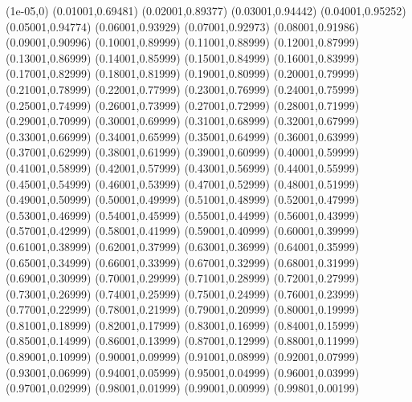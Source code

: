 \newcommand{\pontosEscala}{(102978790.97272025,0.0535502) (637809755.723865,0.888338) (1162674716.9430935,5.47735) (1939420032.5859938,7.1858) (2813296697.925454,31.1917)}
\newcommand{\retaEscala}{(51489395.486360125,0.0267751) (5626593395.850908,2.92589)}
\newcommand{\rotulosEscala}{\node[font=\scriptsize, anchor=north west, inner sep=2pt] at (axis cs:1.02979e+08,0.0535502) {\W{3}};
\node[font=\scriptsize, anchor=north west, inner sep=2pt] at (axis cs:6.3781e+08,0.888338) {\W{4}};
\node[font=\scriptsize, anchor=north west, inner sep=2pt] at (axis cs:1.16267e+09,5.47735) {\W{5}};
\node[font=\scriptsize, anchor=north west, inner sep=2pt] at (axis cs:1.93942e+09,7.1858) {\W{6}};
\node[font=\scriptsize, anchor=north west, inner sep=2pt] at (axis cs:2.8133e+09,31.1917) {\W{7}};}
\newcommand{\pontosVetorPos}{(100000,0.58068) (1000000,0.58948) (10000000,0.58744) (10000000,0.58398) (50000000,0.55454)}
\newcommand{\pontosAtualizacoes}{(121.99882,4.37223) (61.999956,3.71408) (7.999999,1.83981) (14.6806744,2.33595) (2.39999996,1.07483)}
\newcommand{\rotulosAtualizacoes}{\node[font=\scriptsize, anchor=north west, inner sep=2pt] at (axis cs:121.999,4.37223) {\W{3}};
\node[font=\scriptsize, anchor=north west, inner sep=2pt] at (axis cs:62,3.71408) {\W{4}};
\node[font=\scriptsize, anchor=north west, inner sep=2pt] at (axis cs:8,1.83981) {\W{5}};
\node[font=\scriptsize, anchor=north west, inner sep=2pt] at (axis cs:14.6807,2.33595) {\W{6}};
\node[font=\scriptsize, anchor=north west, inner sep=2pt] at (axis cs:2.4,1.07483) {\W{7}};}
\expandafter\def\csname heapTam@W_3\endcsname{(1e-05,0) (0.01001,0.69481) (0.02001,0.89377) (0.03001,0.94442) (0.04001,0.95252) (0.05001,0.94774) (0.06001,0.93929) (0.07001,0.92973) (0.08001,0.91986) (0.09001,0.90996) (0.10001,0.89999) (0.11001,0.88999) (0.12001,0.87999) (0.13001,0.86999) (0.14001,0.85999) (0.15001,0.84999) (0.16001,0.83999) (0.17001,0.82999) (0.18001,0.81999) (0.19001,0.80999) (0.20001,0.79999) (0.21001,0.78999) (0.22001,0.77999) (0.23001,0.76999) (0.24001,0.75999) (0.25001,0.74999) (0.26001,0.73999) (0.27001,0.72999) (0.28001,0.71999) (0.29001,0.70999) (0.30001,0.69999) (0.31001,0.68999) (0.32001,0.67999) (0.33001,0.66999) (0.34001,0.65999) (0.35001,0.64999) (0.36001,0.63999) (0.37001,0.62999) (0.38001,0.61999) (0.39001,0.60999) (0.40001,0.59999) (0.41001,0.58999) (0.42001,0.57999) (0.43001,0.56999) (0.44001,0.55999) (0.45001,0.54999) (0.46001,0.53999) (0.47001,0.52999) (0.48001,0.51999) (0.49001,0.50999) (0.50001,0.49999) (0.51001,0.48999) (0.52001,0.47999) (0.53001,0.46999) (0.54001,0.45999) (0.55001,0.44999) (0.56001,0.43999) (0.57001,0.42999) (0.58001,0.41999) (0.59001,0.40999) (0.60001,0.39999) (0.61001,0.38999) (0.62001,0.37999) (0.63001,0.36999) (0.64001,0.35999) (0.65001,0.34999) (0.66001,0.33999) (0.67001,0.32999) (0.68001,0.31999) (0.69001,0.30999) (0.70001,0.29999) (0.71001,0.28999) (0.72001,0.27999) (0.73001,0.26999) (0.74001,0.25999) (0.75001,0.24999) (0.76001,0.23999) (0.77001,0.22999) (0.78001,0.21999) (0.79001,0.20999) (0.80001,0.19999) (0.81001,0.18999) (0.82001,0.17999) (0.83001,0.16999) (0.84001,0.15999) (0.85001,0.14999) (0.86001,0.13999) (0.87001,0.12999) (0.88001,0.11999) (0.89001,0.10999) (0.90001,0.09999) (0.91001,0.08999) (0.92001,0.07999) (0.93001,0.06999) (0.94001,0.05999) (0.95001,0.04999) (0.96001,0.03999) (0.97001,0.02999) (0.98001,0.01999) (0.99001,0.00999) (0.99801,0.00199)}

